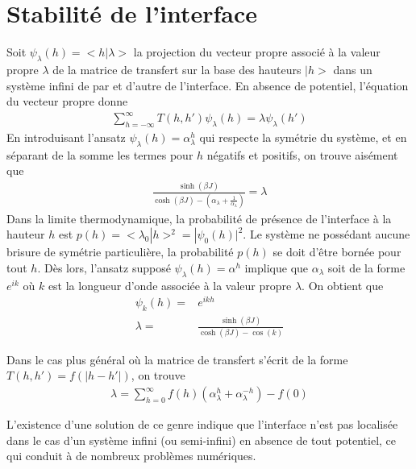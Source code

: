 	\section{Stabilité de l'interface}
	\label{par-stab}

	Soit $\psi_\lambda(h)= <h|\lambda>$ la projection du vecteur propre associé à la valeur propre $\lambda$ de la matrice de transfert sur la base des hauteurs $|h>$ dans un système infini de par et d'autre de l'interface. En absence de potentiel\cite{guyer_sine-gordon_1979,chui_pinning_1981}, l'équation du vecteur propre donne
\begin{align}
	\sum_{h=-\infty}^\infty T(h,h') \psi_\lambda(h) = \lambda \psi_\lambda(h')
\end{align}
En introduisant l'ansatz $\psi_\lambda(h) = \alpha_{\lambda}^h$ qui respecte la symétrie du système, et en séparant de la somme les termes pour $h$ négatifs et positifs, on trouve aisément que 
\begin{align}
	\frac{\sinh(\beta J)}{\cosh(\beta J)-(\alpha_{\lambda}+\frac{1}{\alpha_{\lambda}})} = \lambda
\end{align}
Dans la limite thermodynamique, la probabilité de présence de l'interface à la hauteur $h$ est $p(h) = <\lambda_0|h>^2 = |\psi_0(h)|^2$. Le système ne possédant aucune brisure de symétrie particulière, la probabilité $p(h)$ se doit d'être bornée pour tout $h$. Dès lors, l'ansatz supposé $\psi_\lambda(h) = \alpha^h$ implique que $\alpha_{\lambda}$ soit de la forme $e^{ik}$ où $k$ est la longueur d'onde associée à la valeur propre $\lambda$. On obtient que 
\begin{align}
	\psi_k(h) =& e^{ikh} \\
	\lambda =& \frac{\sinh(\beta J)}{\cosh(\beta J) - \cos(k)}
\end{align}


Dans le cas plus général où la matrice de transfert s'écrit de la forme $T(h,h') = f(|h-h'|)$, on trouve 
\begin{align}
	\lambda = \sum_{h=0}^\infty f(h)(\alpha_{\lambda}^h+\alpha_{\lambda}^{-h}) - f(0)
\end{align}

L'existence d'une solution de ce genre indique que l'interface n'est pas localisée dans le cas d'un système infini (ou semi-infini) en absence de tout potentiel, ce qui conduit à de nombreux problèmes numériques. 

